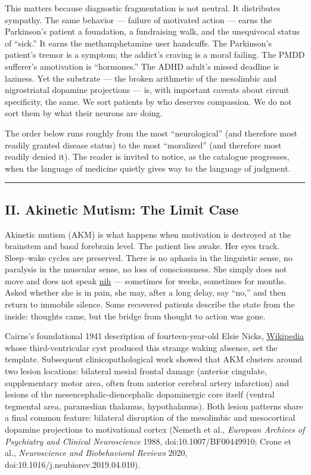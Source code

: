 This matters because diagnostic fragmentation is not neutral. It distributes sympathy. The same behavior --- failure of motivated action --- earns the Parkinson's patient a foundation, a fundraising walk, and the unequivocal status of ``sick.'' It earns the methamphetamine user handcuffs. The Parkinson's patient's tremor is a symptom; the addict's craving is a moral failing. The PMDD sufferer's amotivation is ``hormones.'' The ADHD adult's missed deadline is laziness. Yet the substrate --- the broken arithmetic of the mesolimbic and nigrostriatal dopamine projections --- is, with important caveats about circuit specificity, the same. We sort patients by who deserves compassion. We do not sort them by what their neurons are doing.

The order below runs roughly from the most ``neurological'' (and therefore most readily granted disease status) to the most ``moralized'' (and therefore most readily denied it). The reader is invited to notice, as the catalogue progresses, when the language of medicine quietly gives way to the language of judgment.

\begin{center}\rule{0.5\linewidth}{0.5pt}\end{center}

\subsection{II. Akinetic Mutism: The Limit Case}\label{09_dopamine_spectrum-ii.-akinetic-mutism-the-limit-case}

Akinetic mutism (AKM) is what happens when motivation is destroyed at the brainstem and basal forebrain level. The patient lies awake. Her eyes track. Sleep--wake cycles are preserved. There is no aphasia in the linguistic sense, no paralysis in the muscular sense, no loss of consciousness. She simply does not move and does not speak \href{https://www.ncbi.nlm.nih.gov/pmc/articles/PMC4228725/}{nih} --- sometimes for weeks, sometimes for months. Asked whether she is in pain, she may, after a long delay, say ``no,'' and then return to immobile silence. Some recovered patients describe the state from the inside: thoughts came, but the bridge from thought to action was gone.

Cairns's foundational 1941 description of fourteen-year-old Elsie Nicks, \href{https://en.wikipedia.org/wiki/Akinetic_mutism}{Wikipedia} whose third-ventricular cyst produced this strange waking absence, set the template. Subsequent clinicopathological work showed that AKM clusters around two lesion locations: bilateral mesial frontal damage (anterior cingulate, supplementary motor area, often from anterior cerebral artery infarction) and lesions of the mesencephalic-diencephalic dopaminergic core itself (ventral tegmental area, paramedian thalamus, hypothalamus). Both lesion patterns share a final common feature: bilateral disruption of the mesolimbic and mesocortical dopamine projections to motivational cortex (Nemeth et al., \emph{European Archives of Psychiatry and Clinical Neuroscience} 1988, doi:10.1007/BF00449910; Crone et al., \emph{Neuroscience and Biobehavioral Reviews} 2020, doi:10.1016/j.neubiorev.2019.04.010).

